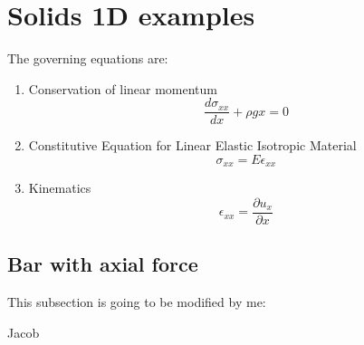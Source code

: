 \documentclass[letterpaper,11pt]{article}
\begin{document}
\section{Solids 1D examples}

The governing equations are:

\begin{enumerate}
\item Conservation of linear momentum
\begin{equation}
\frac{d \sigma_{xx}}{dx} + \rho g x = 0
\end{equation}
\item Constitutive Equation for Linear Elastic Isotropic Material
\begin{equation}
\sigma_{xx} = E \epsilon_{xx}
\end{equation}
\item Kinematics
\begin{equation}
\epsilon_{xx} = \frac{\partial u_x}{\partial x}
\end{equation}
\end{enumerate}

\subsection{Bar with axial force}


This subsection is going to be modified by me:

\huge{Jacob}
\end{document}
